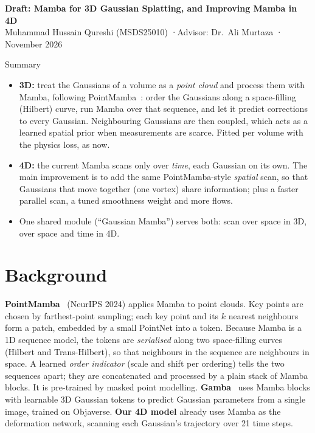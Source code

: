 \documentclass[10pt,a4paper]{article}
\begin{document}
\begin{center}
{\Large\bfseries Draft: Mamba for 3D Gaussian Splatting, and Improving Mamba in 4D}\\[2pt]
Muhammad Hussain Qureshi (MSDS25010) \quad·\quad Advisor: Dr.\ Ali Murtaza \quad· November 2026
\end{center}

\begin{kbox}{Summary}
\begin{itemize}
\item \textbf{3D:} treat the Gaussians of a volume as a \emph{point cloud} and process them with Mamba, following
PointMamba~\cite{pointmamba}: order the Gaussians along a space-filling (Hilbert) curve, run Mamba over that
sequence, and let it predict corrections to every Gaussian. Neighbouring Gaussians are then coupled, which acts as a
learned spatial prior when measurements are scarce. Fitted per volume with the physics loss, as now.
\item \textbf{4D:} the current Mamba scans only over \emph{time}, each Gaussian on its own. The main improvement is to
add the same PointMamba-style \emph{spatial} scan, so that Gaussians that move together (one vortex) share
information; plus a faster parallel scan, a tuned smoothness weight and more flows.
\item One shared module (``Gaussian Mamba'') serves both: scan over space in 3D, over space and time in 4D.
\end{itemize}
\end{kbox}

\section{Background}
\textbf{PointMamba}~\cite{pointmamba} (NeurIPS 2024) applies Mamba to point clouds. Key points are chosen by
farthest-point sampling; each key point and its $k$ nearest neighbours form a patch, embedded by a small PointNet
into a token. Because Mamba is a 1D sequence model, the tokens are \emph{serialised} along two space-filling
curves (Hilbert and Trans-Hilbert), so that neighbours in the sequence are neighbours in space. A learned
\emph{order indicator} (scale and shift per ordering) tells the two sequences apart; they are concatenated and processed
by a plain stack of Mamba blocks. It is pre-trained by masked point modelling.
\textbf{Gamba}~\cite{gamba} uses Mamba blocks with learnable 3D Gaussian tokens to predict Gaussian parameters from a
single image, trained on Objaverse. \textbf{Our 4D model} already uses Mamba as the deformation network, scanning
each Gaussian's trajectory over 21 time steps.
\end{document}
